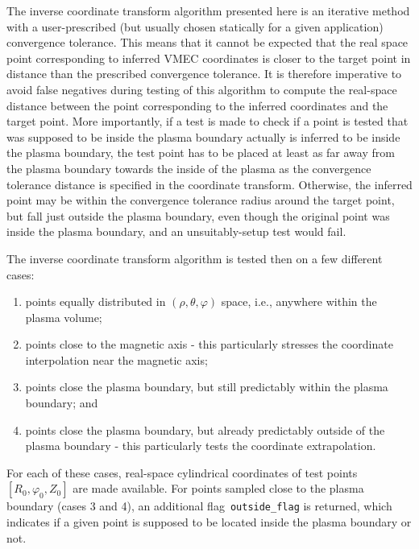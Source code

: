 The inverse coordinate transform algorithm presented here
is an iterative method with a user-prescribed (but usually chosen statically for a given application) convergence tolerance.
%
This means that it cannot be expected that the real space point
corresponding to inferred VMEC coordinates is closer to the target point in distance
than the prescribed convergence tolerance.
%
It is therefore imperative to avoid false negatives during testing of this algorithm
to compute the real-space distance between the point corresponding to the inferred coordinates
and the target point.
%
More importantly, if a test is made to check if a point is tested that was supposed to be inside the plasma boundary
actually is inferred to be inside the plasma boundary,
the test point has to be placed at least as far away from the plasma boundary towards the inside of the plasma
as the convergence tolerance distance is specified in the coordinate transform.
%
Otherwise, the inferred point may be within the convergence tolerance radius
around the target point, but fall just outside the plasma boundary,
even though the original point was inside the plasma boundary,
and an unsuitably-setup test would fail.

The inverse coordinate transform algorithm is tested then on a few different cases:
\begin{enumerate}
 \item points equally distributed in $(\rho, \theta, \varphi)$ space, i.e., anywhere within the plasma volume;
 \item points close to the magnetic axis
       - this particularly stresses the coordinate interpolation near the magnetic axis;
 \item points close the plasma boundary, but still predictably within the plasma boundary; and
 \item points close the plasma boundary, but already predictably outside of the plasma boundary
       - this particularly tests the coordinate extrapolation.
\end{enumerate}
%
For each of these cases, real-space cylindrical coordinates of test points~$[R_0, \varphi_0, Z_0]$
are made available. For points sampled close to the plasma boundary (cases 3 and 4),
an additional flag~\texttt{outside\_flag} is returned, which indicates if a given point is supposed
to be located inside the plasma boundary or not.

